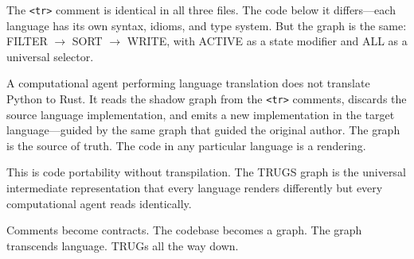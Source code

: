 \documentclass{article}
\begin{document}
The \texttt{<tr>} comment is identical in all three files. The code below it differs---each language has its own syntax, idioms, and type system. But the graph is the same: FILTER $\to$ SORT $\to$ WRITE, with ACTIVE as a state modifier and ALL as a universal selector.

A computational agent performing language translation does not translate Python to Rust. It reads the shadow graph from the \texttt{<tr>} comments, discards the source language implementation, and emits a new implementation in the target language---guided by the same graph that guided the original author. The graph is the source of truth. The code in any particular language is a rendering.

This is code portability without transpilation. The TRUGS graph is the universal intermediate representation that every language renders differently but every computational agent reads identically.

\bigskip

Comments become contracts. The codebase becomes a graph. The graph transcends language. TRUGs all the way down.
\end{document}
